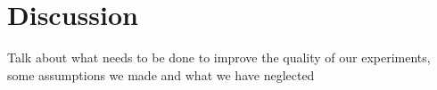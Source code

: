 \section{Discussion}
Talk about what needs to be done to improve the quality of our experiments, some assumptions we made and what we have neglected
\label{sec:discussion}
